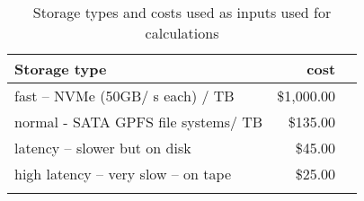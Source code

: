 \tiny \begin{longtable} { |p{}  |r  |r |} 
\caption{Storage types and costs used as inputs used for calculations \label{tab:Storage}}\\ 
\hline 
\textbf{Storage type }&\textbf{cost} \\ \hline
{fast -- NVMe (50GB/ s each) / TB  }&{\$1,000.00} \\ \hline
{normal - SATA GPFS file systems/ TB  }&{\$135.00} \\ \hline
{latency -- slower but on disk }&{\$45.00} \\ \hline
{high latency -- very slow -- on tape }&{\$25.00} \\ \hline
{}&{} \\ \hline
\end{longtable} \normalsize
